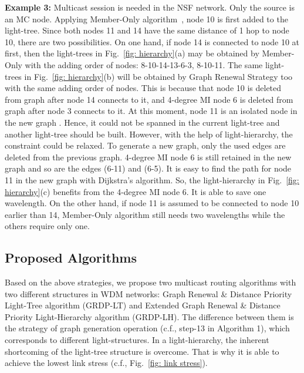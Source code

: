 \documentclass[conference]{IEEEtran}
\begin{document}
\textbf{Example 3:} Multicast session  is needed in the NSF network. Only the source is an MC node. Applying Member-Only algorithm~\cite{xjzhang2000}, node 10 is first added to the light-tree. Since both nodes 11 and 14 have the same distance of 1 hop to node 10, there are two possibilities. On one hand, if node 14 is connected to node 10 at first, then the light-trees in Fig.~\ref{fig: hierarchy}(a) may be obtained by Member-Only with the adding order of nodes: 8-10-14-13-6-3, 8-10-11. The same light-trees in Fig.~\ref{fig: hierarchy}(b) will be obtained by Graph Renewal Strategy too with the same adding order of nodes. This is because that node 10 is deleted from graph  after node 14 connects to it, and 4-degree MI node 6 is deleted from graph  after node 3 connects to it. At this moment, node 11 is an isolated node in the new graph . Hence, it could not be spanned in the current light-tree and another light-tree should be built. However, with the help of light-hierarchy, the constraint could be relaxed. To generate a new graph, only the used edges are deleted from the previous graph. 4-degree MI node 6 is still retained in the new graph and so are the edges (6-11) and (6-5). It is easy to find the path  for node 11 in the new graph with Dijkstra's algorithm. So, the light-hierarchy in Fig.~\ref{fig: hierarchy}(c) benefits from the 4-degree MI node 6. It is able to save one wavelength. On the other hand, if node 11 is assumed to be connected to node 10 earlier than 14, Member-Only algorithm still needs two wavelengths while the others require only one.

\subsection{Proposed Algorithms}
\label{subsec: Proposed Algorithms}
Based on the above strategies, we propose two multicast routing algorithms with two different structures in WDM networks: Graph Renewal \& Distance Priority Light-Tree algorithm (GRDP-LT) and Extended Graph Renewal \& Distance Priority Light-Hierarchy algorithm (GRDP-LH). The difference between them is the strategy of graph generation operation (c.f., step-13 in Algorithm 1), which corresponds to different light-structures. In a light-hierarchy, the inherent shortcoming of the light-tree structure is overcome. That is why it is able to achieve the lowest link stress (c.f., Fig.~\ref{fig: link stress}).
\end{document}
